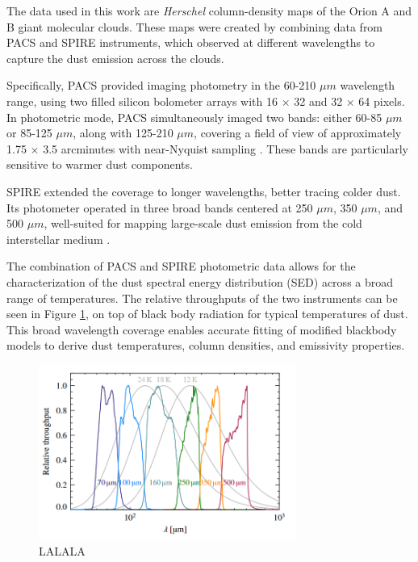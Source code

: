 The data used in this work are \textit{Herschel} column-density maps of the Orion A and B giant molecular clouds. These maps were created by combining data from PACS and SPIRE instruments, which observed at different wavelengths to capture the dust emission across the clouds.

Specifically, PACS provided imaging photometry in the 60-210 $\mu m$ wavelength range, using two filled silicon bolometer arrays with 16 $\times$ 32 and 32 $\times$ 64 pixels. In photometric mode, PACS simultaneously imaged two bands: either 60-85 $\mu m$ or 85-125 $\mu m$, along with 125-210 $\mu m$, covering a field of view of approximately 1.75 $\times$ 3.5 arcminutes with near-Nyquist sampling \cite{poglitsch2010photodetector}. These bands are particularly sensitive to warmer dust components.

SPIRE extended the coverage to longer wavelengths, better tracing colder dust. Its photometer operated in three broad bands centered at 250 $\mu m$, 350 $\mu m$, and 500 $\mu m$, well-suited for mapping large-scale dust emission from the cold interstellar medium \cite{griffin2010herschel}. 

The combination of PACS and SPIRE photometric data allows for the characterization of the dust spectral energy distribution (SED) across a broad range of temperatures. The relative throughputs of the two instruments can be seen in Figure \ref{fig:pacs_spire_throughputs}, on top of black body radiation for typical temperatures of dust. This broad wavelength coverage enables accurate fitting of modified blackbody models to derive dust temperatures, column densities, and emissivity properties.

\begin{figure}
    \centering
    \includegraphics[width=0.75\textwidth]{figures/relative_throughputs_PACS_SPIRE.png}
    \caption{LALALA \cite{lombardi2014herschel}}
    \label{fig:pacs_spire_throughputs}
\end{figure}

